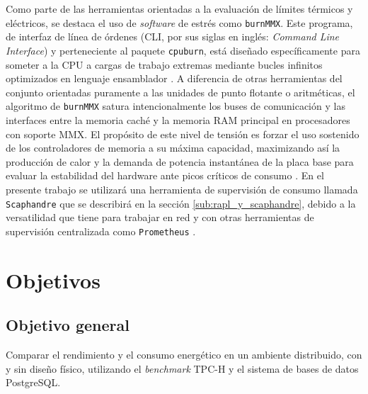 \documentclass[12pt, letter paper]{report}
\begin{document}
        Como parte de las herramientas orientadas a la evaluación de límites
        térmicos y eléctricos, se destaca el uso de \textit{software} de estrés
        como \texttt{burnMMX}. Este programa, de interfaz de línea de órdenes
        (CLI, por sus siglas en inglés: \textit{Command Line Interface}) y
        perteneciente al paquete \texttt{cpuburn}, está diseñado específicamente
        para someter a la CPU a cargas de trabajo extremas mediante bucles
        infinitos optimizados en lenguaje ensamblador
        \cite{redelmeier2011cpuburn}. A diferencia de otras herramientas del
        conjunto orientadas puramente a las unidades de punto flotante o
        aritméticas, el algoritmo de \texttt{burnMMX} satura intencionalmente
        los buses de comunicación y las interfaces entre la memoria caché y la
        memoria RAM principal en procesadores  con soporte MMX. El propósito de
        este nivel de tensión es forzar el uso sostenido de los controladores de
        memoria a su máxima capacidad, maximizando así la producción de calor y
        la demanda de potencia instantánea de la placa base para evaluar la
        estabilidad del hardware ante picos críticos de consumo
        \cite{redelmeierburnmmx12011}. En el presente trabajo se utilizará
        una herramienta de supervisión de consumo llamada \texttt{Scaphandre}
        que se describirá en la sección \ref{sub:rapl_y_scaphandre}, debido a la
        versatilidad que tiene para trabajar en red y con otras herramientas de
        supervisión centralizada como \texttt{Prometheus}
        \cite{hubblohubblo-orgscaphandre2025}.

    \section{Objetivos} %
    \label{sec:objetivos}
      \subsection{Objetivo general} %
      \label{sub:objetivo_general}
        Comparar el rendimiento y el consumo energético en un ambiente
        distribuido, con y sin diseño físico, utilizando el \textit{benchmark}
        TPC-H y el sistema de bases de datos PostgreSQL.
\end{document}
